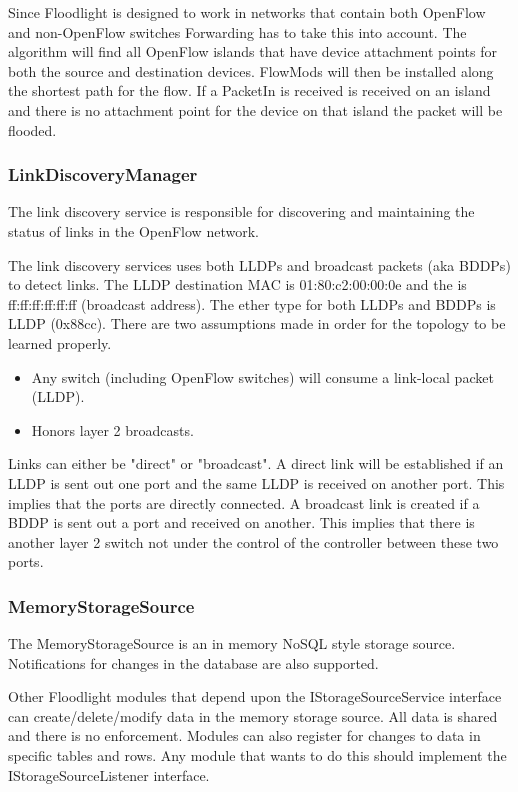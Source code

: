 \documentclass[12pt,a4paper]{article}
\begin{document}
Since Floodlight is designed to work in networks that contain both OpenFlow and non-OpenFlow switches Forwarding has to take this into account. The algorithm will find all OpenFlow islands that have device attachment points for both the source and destination devices. FlowMods will then be installed along the shortest path for the flow. If a PacketIn is received is received on an island and there is no attachment point for the device on that island the packet will be flooded.


\subsubsection{LinkDiscoveryManager}
The link discovery service is responsible for discovering and maintaining the status of links in the OpenFlow network.


The link discovery services uses both LLDPs and broadcast packets (aka BDDPs) to detect links. The LLDP destination MAC is 01:80:c2:00:00:0e and the is ff:ff:ff:ff:ff:ff (broadcast address). The ether type for both LLDPs and BDDPs is LLDP (0x88cc). There are two assumptions made in order for the topology to be learned properly.

\begin{itemize}


\item Any switch (including OpenFlow switches) will consume a link-local packet (LLDP).
\item Honors layer 2 broadcasts.
\end{itemize}
Links can either be "direct" or "broadcast". A direct link will be established if an LLDP is sent out one port and the same LLDP is received on another port. This implies that the ports are directly connected. A broadcast link is created if a BDDP is sent out a port and received on another. This implies that there is another layer 2 switch not under the control of the controller between these two ports.


\subsubsection{MemoryStorageSource}
The MemoryStorageSource is an in memory NoSQL style storage source. Notifications for changes in the database are also supported.

Other Floodlight modules that depend upon the IStorageSourceService interface can create/delete/modify data in the memory storage source. All data is shared and there is no enforcement. Modules can also register for changes to data in specific tables and rows. Any module that wants to do this should implement the IStorageSourceListener interface.
\end{document}
